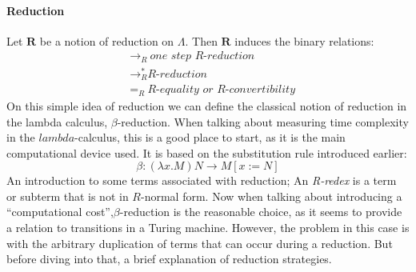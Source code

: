 \documentclass[12pt]{article}
\begin{document}
\paragraph{Reduction} Let $\textbf{R}$ be a notion of reduction on $\Lambda$. Then $\textbf{R}$ induces the binary relations:
\begin{equation}
  \begin{split}
          &{\rightarrow}_{R} \ \textit{one step R-reduction} \\
          &\rightarrow_{R}^{*} \textit{R-reduction} \\
          &=_{R} \ \textit{R-equality or R-convertibility}
  \end{split}
\end{equation}
On this simple idea of reduction we can define the classical notion of reduction in the lambda calculus, $\beta$-reduction. When talking about measuring time complexity in the $lambda$-calculus, this is a good place to start, as it is the main computational device used.
It is based on the substitution rule introduced earlier:
\begin{equation}
  \beta : ( \lambda x.M ) N \rightarrow M [ x:=N ]
\end{equation}
An introduction to some terms associated with reduction; An \textit{R-redex} is a term or subterm that is not in $R$-normal form.
Now when talking about introducing a \enquote{computational cost},$\beta$-reduction is the reasonable choice, as it seems to provide a relation to transitions in a Turing machine. However, the problem in this case is with the arbitrary duplication of terms that can occur during a reduction.
But before diving into that, a brief explanation of reduction strategies.
\end{document}
